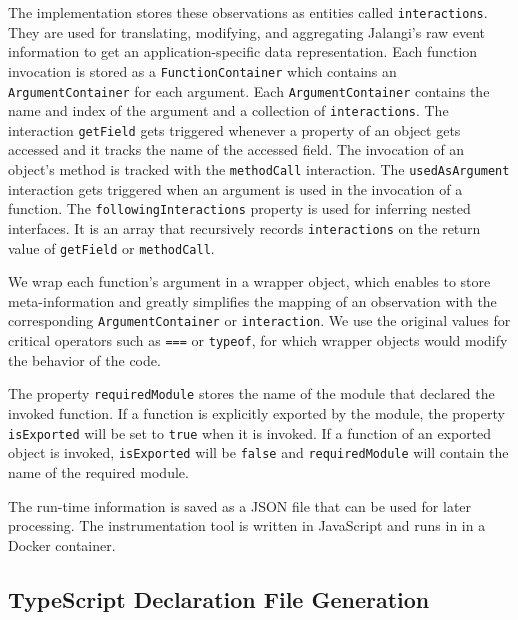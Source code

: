 \documentclass[english,cleveref,autoref,submission]{programming}
\begin{document}
The implementation stores these observations as entities called
\texttt{interactions}. They are used for translating, modifying, and
aggregating Jalangi's raw event information to get an application-specific data representation. Each function invocation is stored as a \texttt{FunctionContainer} which contains an \texttt{ArgumentContainer} for each argument. Each \texttt{ArgumentContainer} contains the name and index of the argument and a collection of \texttt{interactions}. The interaction \texttt{getField} gets triggered whenever a property of an object gets accessed and it tracks the name of the accessed field. The invocation of an object's method is tracked with the \texttt{methodCall} interaction. The \texttt{usedAsArgument} interaction gets triggered when an argument is used in the invocation of a function. The \texttt{followingInteractions} property is used for inferring nested interfaces. It is an array that recursively records \texttt{interactions} on the return value of \texttt{getField} or \texttt{methodCall}.

We wrap each function's argument in a wrapper object, which enables to store meta-information and greatly simplifies the mapping of an observation with the corresponding \texttt{ArgumentContainer} or \texttt{interaction}. We use the original values for critical operators such as \texttt{===} or \texttt{typeof}, for which wrapper objects would modify the behavior of the code.

The property \texttt{requiredModule} stores the name of the module that declared the invoked function. If a function is explicitly exported by the module, the property \texttt{isExported} will be set to \texttt{true} when it is invoked. If a function of an exported object is invoked, \texttt{isExported} will be \texttt{false} and \texttt{requiredModule} will contain the name of the required module.

The run-time information is saved as a JSON file that can be used for later
processing. The instrumentation tool is written in JavaScript and runs in \NodeJS{} in a
Docker container.   

\subsection{TypeScript Declaration File Generation}
\label{sec:typescr-decl-file}
\end{document}
